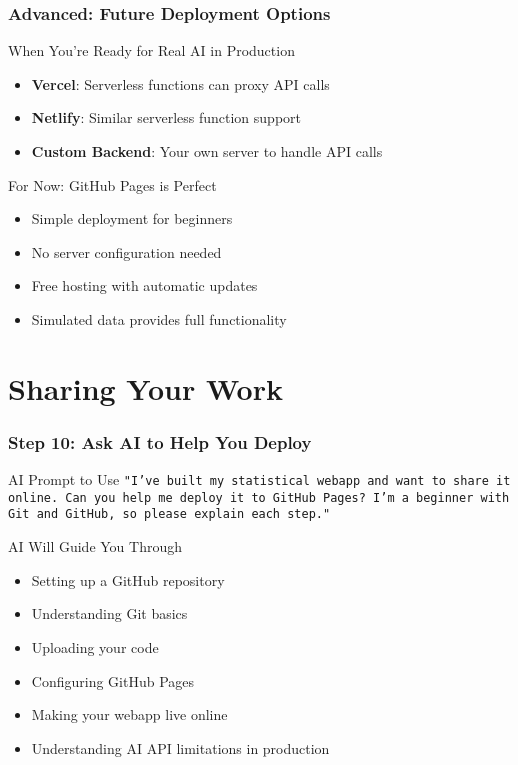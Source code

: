 \documentclass[aspectratio=169]{beamer}
\begin{document}
\begin{frame}
\frametitle{Advanced: Future Deployment Options}
\begin{alertblock}{When You're Ready for Real AI in Production}
\begin{itemize}
\item \textbf{Vercel}: Serverless functions can proxy API calls
\item \textbf{Netlify}: Similar serverless function support
\item \textbf{Custom Backend}: Your own server to handle API calls
\end{itemize}
\end{alertblock}

\begin{exampleblock}{For Now: GitHub Pages is Perfect}
\begin{itemize}
\item Simple deployment for beginners
\item No server configuration needed
\item Free hosting with automatic updates
\item Simulated data provides full functionality
\end{itemize}
\end{exampleblock}
\end{frame}

\section{Sharing Your Work}

\begin{frame}
\frametitle{Step 10: Ask AI to Help You Deploy}
\begin{alertblock}{AI Prompt to Use}
\texttt{"I've built my statistical webapp and want to share it online. Can you help me deploy it to GitHub Pages? I'm a beginner with Git and GitHub, so please explain each step."}
\end{alertblock}

\begin{exampleblock}{AI Will Guide You Through}
\begin{itemize}
\item Setting up a GitHub repository
\item Understanding Git basics
\item Uploading your code
\item Configuring GitHub Pages
\item Making your webapp live online
\item Understanding AI API limitations in production
\end{itemize}
\end{exampleblock}
\end{frame}
\end{document}
